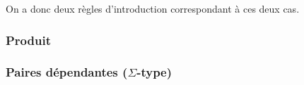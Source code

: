 \documentclass[../../rapport.tex]{subfiles}
\begin{document}
  On a donc deux règles d'introduction correspondant à ces deux cas.

  \subsubsection{Produit}

  \subsubsection{Paires dépendantes ($\Sigma$-type)}
\end{document}
